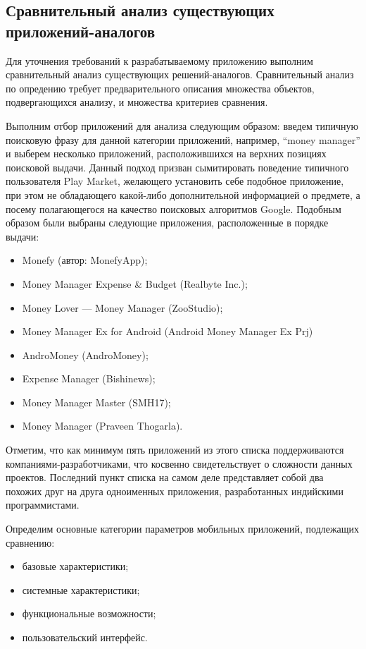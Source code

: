 \subsection{Сравнительный анализ существующих приложений-аналогов}

Для уточнения требований к разрабатываемому приложению
выполним сравнительный анализ существующих решений-аналогов.
Сравнительный анализ по опредению требует предварительного
описания множества объектов, подвергающихся анализу,
и множества критериев сравнения.

Выполним отбор приложений для анализа следующим образом:
введем типичную поисковую фразу для данной категории приложений,
например, ``money manager'' и выберем несколько приложений,
расположившихся на верхних позициях поисковой выдачи.
Данный подход призван сымитировать поведение типичного пользователя
Play Market, желающего установить себе подобное приложение,
при этом не обладающего какой-либо дополнительной информацией о предмете,
а посему полагающегося на качество поисковых алгоритмов Google.
Подобным образом были выбраны следующие приложения, расположенные
в порядке выдачи:
\begin{itemize}
\item Monefy (автор: MonefyApp);
\item Money Manager Expense \& Budget (Realbyte Inc.);
\item Money Lover --- Money Manager (ZooStudio);
\item Money Manager Ex for Android (Android Money Manager Ex Prj)
\item AndroMoney (AndroMoney);
\item Expense Manager (Bishinews);
\item Money Manager Master (SMH17);
\item Money Manager (Praveen Thogarla).
\end{itemize}

Отметим, что как минимум пять приложений из этого списка поддерживаются
компаниями-разработчиками, что косвенно свидетельствует о сложности данных проектов.
Последний пункт списка на самом деле представляет собой два похожих друг
на друга одноименных приложения, разработанных индийскими программистами.

Определим основные категории параметров мобильных приложений, подлежащих сравнению:
\begin{itemize}
\item базовые характеристики;
\item системные характеристики;
\item функциональные возможности;
\item пользовательский интерфейс.
\end{itemize}

